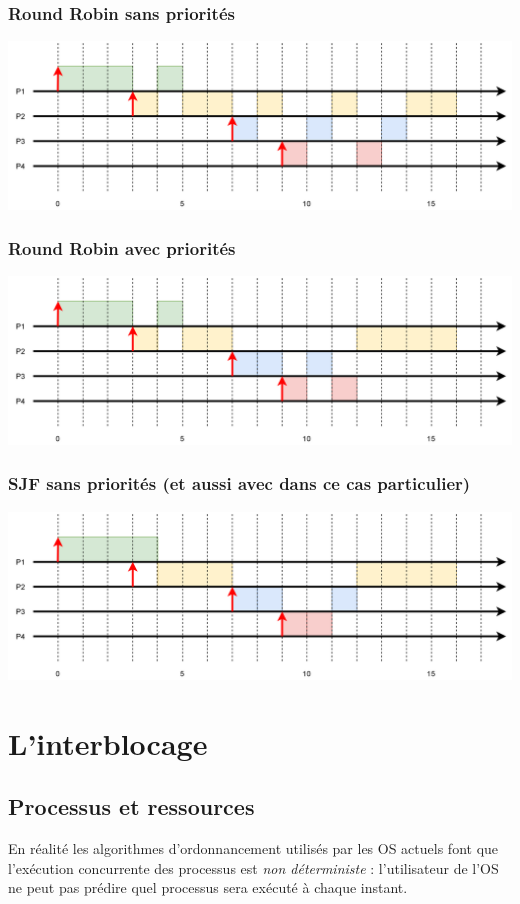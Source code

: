 \documentclass[10pt,firamath,cours]{nsi}
\begin{document}
\subsubsection{Round Robin sans priorités}
\includegraphics[width=\linewidth]{img/RR}

\subsubsection{Round Robin avec priorités}
\includegraphics[width=\linewidth]{img/RRP}

\subsubsection{SJF sans priorités (et aussi avec dans ce cas particulier)}
\includegraphics[width=\linewidth]{img/SJF}





\section{L'interblocage}
\subsection{Processus et ressources}
En réalité les algorithmes d'ordonnancement utilisés par les OS actuels font que  l'exécution concurrente des processus est \textit{non déterministe} : l'utilisateur de l'OS ne peut pas prédire quel processus sera exécuté à chaque instant.\\
\end{document}
